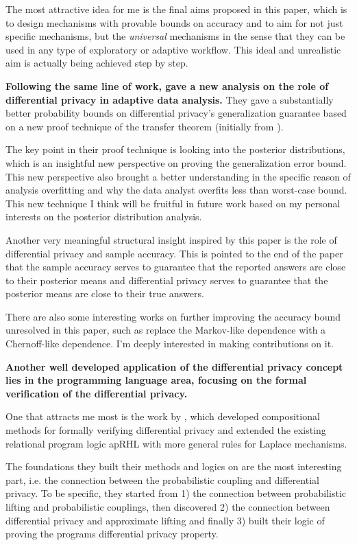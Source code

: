 \documentclass{article}
\begin{document}
The most attractive idea for me is the final aims proposed in this paper, which is to design mechanisms with provable bounds on accuracy and to aim for not just specific mechanisms, but the \emph{universal} mechanisms in the sense that they can be used in any type of exploratory or adaptive workflow.
This ideal and unrealistic aim is actually being achieved step by step.

\textbf{Following the same line of work, \cite{jung2019new} gave a new analysis on the role of differential privacy in adaptive data analysis.}
They gave a substantially better probability bounds on differential privacy's generalization guarantee based on a new proof technique of the transfer theorem (initially from \cite{dwork2015generalization}). 

The key point in their proof technique is looking into the posterior distributions, which is an insightful new perspective on proving the generalization error bound. This new perspective also brought a better understanding in the specific reason of analysis overfitting and why the data analyst overfits less than worst-case bound. This new technique I think will be fruitful in future work based on my personal interests on the posterior distribution analysis.

Another very meaningful structural insight inspired by this paper is the role of differential privacy and sample accuracy. This is pointed to the end of the paper that the sample accuracy serves to guarantee that the reported answers are close to their posterior means and differential privacy serves to guarantee that the posterior means are close to their true answers.

There are also some interesting works on further improving the accuracy bound unresolved in this paper, such as replace the Markov-like dependence with a Chernoff-like dependence. I'm deeply interested in making contributions on it.


\textbf{Another well developed application of the differential privacy concept lies in the programming language area, focusing on the formal verification of the differential privacy.} 

One that attracts me most is the work by \cite{barthe2016proving}, which developed compositional methods for formally verifying differential privacy and extended the existing relational program logic apRHL with more general rules for Laplace mechanisms.

The foundations they built their methods and logics on are the most interesting part, i.e. the connection between the probabilistic coupling and differential privacy. To be specific, they started from 1) the connection between probabilistic lifting and probabilistic couplings, then discovered 2) the connection between differential privacy and approximate lifting and finally 3) built their logic of proving the programs differential privacy property.
\end{document}

